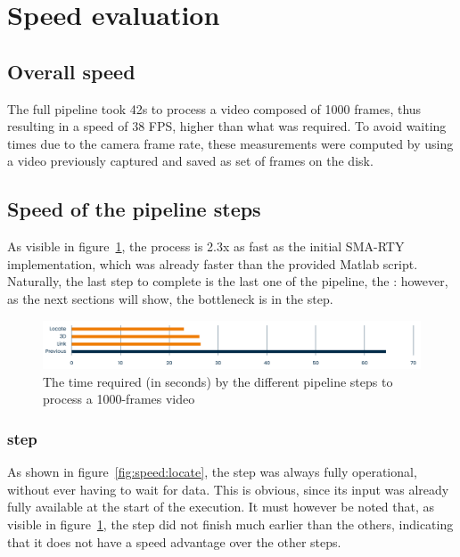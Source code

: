 \section{Speed evaluation}
\label{sec:results:speed}

\subsection{Overall speed}

The full pipeline took 42s to process a video composed of 1000 frames, thus resulting in a speed of 38 FPS, higher than what was required.
To avoid waiting times due to the camera frame rate, these measurements were computed by using a video previously captured and saved as set of frames on the disk.

\subsection{Speed of the pipeline steps}

As visible in figure~\ref{fig:speed:all-pipeline}, the process is 2.3x as fast as the initial SMA-RTY implementation, which was already faster than the provided Matlab script.
Naturally, the last step to complete is the last one of the pipeline, the \link*: however, as the next sections will show, the bottleneck is in the \locate* step.

\begin{figure}
	\centerline{\includegraphics[width=\textwidth]{images/speed/overall-speed.png}}
	\caption{\centering The time required (in seconds) by the different pipeline steps to process a 1000-frames video}
	\label{fig:speed:all-pipeline}
\end{figure}

\subsubsection{\locate* step}

As shown in figure~\ref{fig:speed:locate}, the \locate* step was always fully operational, without ever having to wait for data.
This is obvious, since its input was already fully available at the start of the execution.
It must however be noted that, as visible in figure~\ref{fig:speed:all-pipeline}, the \locate* step did not finish much earlier than the others, indicating that it does not have a speed advantage over the other steps.

